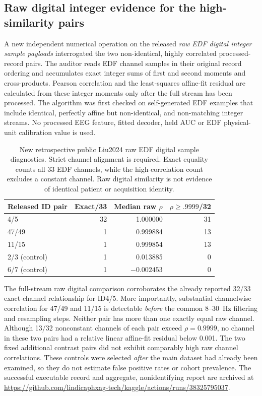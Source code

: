 \subsection{Raw digital integer evidence for the high-similarity pairs}
\label{sec:p2-raw-digital-affine}
A new independent numerical operation on the released
\emph{raw EDF digital integer sample payloads} interrogated
the two non-identical, highly correlated processed-record
pairs. The auditor reads EDF channel samples in their original
record ordering and accumulates exact integer sums of first
and second moments and cross-products. Pearson correlation
and the least-squares affine-fit residual are calculated
from these integer moments only after the full stream has
been processed. The algorithm was first checked on
self-generated EDF examples that include identical,
perfectly affine but non-identical, and non-matching
integer streams. No processed EEG feature, fitted decoder,
held AUC or EDF physical-unit calibration value is used.

\begin{table}[tb]
\centering\small
\caption{New retrospective public Liu2024 raw EDF digital
sample diagnostics. Strict channel alignment is required.
Exact equality counts all 33 EDF channels, while the
high-correlation count excludes a constant channel.
Raw digital similarity is not evidence of identical
patient or acquisition identity.}
\label{tab:p2-raw-affine}
\setlength{\tabcolsep}{4pt}
\begin{tabular}{lrrr}
\toprule
Released ID pair & Exact/33 & Median raw $\rho$ & $\rho\geq .9999$/32\\
\midrule
4/5 & 32 & 1.000000 & 31\\
47/49 & 1 & 0.999884 & 13\\
11/15 & 1 & 0.999854 & 13\\
2/3 (control) & 1 & 0.013885 & 0\\
6/7 (control) & 1 & $-0.002453$ & 0\\
\bottomrule
\end{tabular}
\end{table}

The full-stream raw digital comparison corroborates
the already reported 32/33 exact-channel relationship
for ID4/5. More importantly, substantial
channelwise correlation for 47/49 and 11/15
is detectable \emph{before} the common 8--30~Hz
filtering and resampling steps. Neither pair has
more than one exactly equal raw channel.
Although 13/32 nonconstant channels of each
pair exceed $\rho=0.9999$, no channel in
these two pairs had a relative linear
affine-fit residual below 0.001.
The two fixed additional contrast pairs did not
exhibit comparably high raw channel correlations.
These controls were selected \emph{after} the main
dataset had already been examined, so they do
not estimate false positive rates or cohort
prevalence. The successful executable record and
aggregate, nonidentifying report are archived at
\url{https://github.com/lindicaphxag-tech/kaggle/actions/runs/38325795037}.

